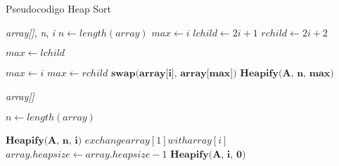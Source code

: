 \begin{algorithm}
\caption{Pseudocodigo Heap Sort}
\label{alg:label}
\begin{algorithmic}
{\textit{array[]},\textit{ n},\textit{ i}}
\State $n \gets length(array)$
\State $max \gets i$
\State $lchild \gets 2i + 1$
\State $rchild \gets 2i + 2$



\vspace{0.2cm}
\State $max \gets lchild$

\Else 
\State $max \gets i$
\EndIf
{}
\State $max \gets rchild$
\EndIf
{}
\State $\textbf{swap(array[i], array[max])}$
\State  $\textbf{Heapify(A, n, max)}$
\EndIf

\EndFunction
\vspace{0.5cm}
{\textit{array[]}}

\State $n \gets length(array)$

\State  $\textbf{Heapify(A, n, i)}$
\EndFor
{}
\State $exchange array[1] with array[i]$
\State $array.heapsize \gets  array.heapsize
 - 1$
\State  $\textbf{Heapify(A, i, 0)}$
\EndFor
\EndFunction
\end{algorithmic}
\end{algorithm}



